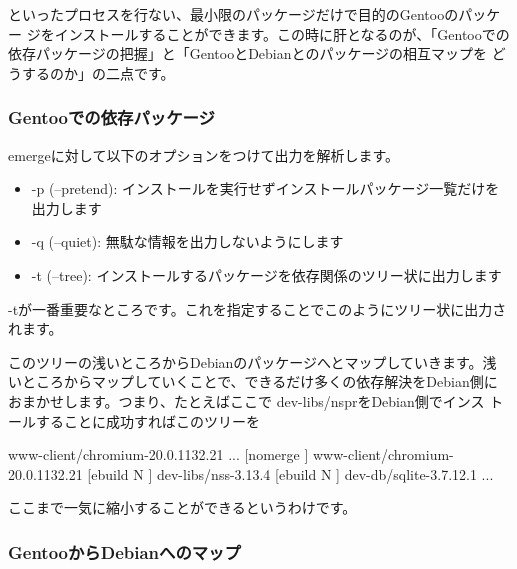 \documentclass[mingoth,a4paper]{jsarticle}
\begin{document}
といったプロセスを行ない、最小限のパッケージだけで目的のGentooのパッケー
ジをインストールすることができます。この時に肝となるのが、「Gentooでの
  依存パッケージの把握」と「GentooとDebianとのパッケージの相互マップを
  どうするのか」の二点です。

\subsubsection{Gentooでの依存パッケージ}

emergeに対して以下のオプションをつけて出力を解析します。

\begin{itemize}
\item -p (--pretend): インストールを実行せずインストールパッケージ一覧だけを出力します
\item -q (--quiet): 無駄な情報を出力しないようにします
\item -t (--tree): インストールするパッケージを依存関係のツリー状に出力します
\end{itemize}

-tが一番重要なところです。これを指定することでこのようにツリー状に出力されます。


このツリーの浅いところからDebianのパッケージへとマップしていきます。浅
いところからマップしていくことで、できるだけ多くの依存解決をDebian側に
おまかせします。つまり、たとえばここで dev-libs/nsprをDebian側でインス
トールすることに成功すればこのツリーを

\begin{commandline}
[ebuild  N    ] www-client/chromium-20.0.1132.21
...
[nomerge      ] www-client/chromium-20.0.1132.21
[ebuild  N    ]  dev-libs/nss-3.13.4
[ebuild  N    ]   dev-db/sqlite-3.7.12.1
...
\end{commandline}

ここまで一気に縮小することができるというわけです。

\subsubsection{GentooからDebianへのマップ}
\end{document}
